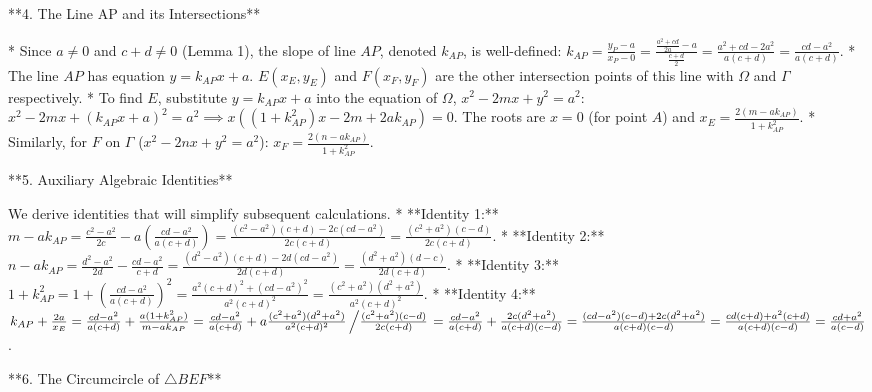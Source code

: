 **4. The Line AP and its Intersections**

*   Since $a \neq 0$ and $c+d \neq 0$ (Lemma 1), the slope of line $AP$, denoted $k_{AP}$, is well-defined:
    $k_{AP} = \frac{y_P-a}{x_P-0} = \frac{\frac{a^2+cd}{2a}-a}{\frac{c+d}{2}} = \frac{a^2+cd-2a^2}{a(c+d)} = \frac{cd-a^2}{a(c+d)}$.
*   The line $AP$ has equation $y=k_{AP}x+a$. $E(x_E, y_E)$ and $F(x_F, y_F)$ are the other intersection points of this line with $\Omega$ and $\Gamma$ respectively.
*   To find $E$, substitute $y=k_{AP}x+a$ into the equation of $\Omega$, $x^2-2mx+y^2=a^2$:
    $x^2-2mx+(k_{AP}x+a)^2=a^2 \implies x((1+k_{AP}^2)x - 2m + 2ak_{AP})=0$.
    The roots are $x=0$ (for point $A$) and $x_E = \frac{2(m-ak_{AP})}{1+k_{AP}^2}$.
*   Similarly, for $F$ on $\Gamma$ ($x^2-2nx+y^2=a^2$): $x_F = \frac{2(n-ak_{AP})}{1+k_{AP}^2}$.

**5. Auxiliary Algebraic Identities**

We derive identities that will simplify subsequent calculations.
*   **Identity 1:** $m-ak_{AP} = \frac{c^2-a^2}{2c} - a\left(\frac{cd-a^2}{a(c+d)}\right) = \frac{(c^2-a^2)(c+d) - 2c(cd-a^2)}{2c(c+d)} = \frac{(c^2+a^2)(c-d)}{2c(c+d)}$.
*   **Identity 2:** $n-ak_{AP} = \frac{d^2-a^2}{2d} - \frac{cd-a^2}{c+d} = \frac{(d^2-a^2)(c+d) - 2d(cd-a^2)}{2d(c+d)} = \frac{(d^2+a^2)(d-c)}{2d(c+d)}$.
*   **Identity 3:** $1+k_{AP}^2 = 1+\left(\frac{cd-a^2}{a(c+d)}\right)^2 = \frac{a^2(c+d)^2+(cd-a^2)^2}{a^2(c+d)^2} = \frac{(c^2+a^2)(d^2+a^2)}{a^2(c+d)^2}$.
*   **Identity 4:** $k_{AP}+\frac{2a}{x_E} = \frac{cd-a^2}{a(c+d)} + \frac{a(1+k_{AP}^2)}{m-ak_{AP}} = \frac{cd-a^2}{a(c+d)} + a \frac{(c^2+a^2)(d^2+a^2)}{a^2(c+d)^2} \left/ \frac{(c^2+a^2)(c-d)}{2c(c+d)} \right. = \frac{cd-a^2}{a(c+d)} + \frac{2c(d^2+a^2)}{a(c+d)(c-d)} = \frac{(cd-a^2)(c-d)+2c(d^2+a^2)}{a(c+d)(c-d)} = \frac{cd(c+d)+a^2(c+d)}{a(c+d)(c-d)} = \frac{cd+a^2}{a(c-d)}$.

**6. The Circumcircle of $\triangle BEF$**

